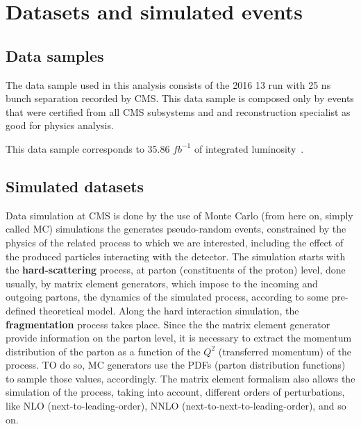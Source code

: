 \section{Datasets and simulated events} \label{datasets_and_MC_samples}

\subsection{Data samples}

The data sample used in this analysis consists of the 2016 13 \TeV run
with 25 ns bunch separation recorded by CMS. This data sample is composed only by events that were certified from all CMS subsystems and and reconstruction specialist as good for physics analysis.

This data sample corresponds to 35.86 $fb^{-1}$ of integrated luminosity~\cite{CMS-PAS-LUM-17-001}.


% 



\subsection{Simulated datasets}
\label{sec:datasets}

Data simulation at CMS is done by the use of Monte Carlo (from here on, simply called MC) simulations the generates pseudo-random events, constrained by the physics of the related process to which we are interested, including the effect of the produced particles interacting with the detector. The simulation starts with the \textbf{hard-scattering} process, at parton (constituents of the proton) level, done usually, by matrix element generators, which impose to the incoming and outgoing partons, the dynamics of the simulated process, according to some pre-defined theoretical model. Along the hard interaction simulation, the \textbf{fragmentation} process takes place. Since the the matrix element generator provide information on the parton level, it is necessary to extract the momentum distribution of the parton as a function of the $Q^2$ (transferred momentum) of the process. TO do so, MC generators use the PDFs (parton distribution functions) to sample those values, accordingly. The matrix element formalism also allows the simulation of the process, taking into account, different orders of perturbations, like NLO (next-to-leading-order), NNLO (next-to-next-to-leading-order), and so on.

